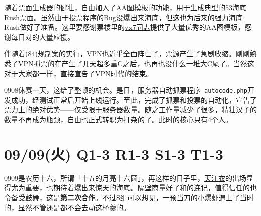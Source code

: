 随着票面生成器的健壮，\uline{自由}加入了AA图模板的功能，用于生成典型的53海底Rush票面。虽然由于投票程序的Bug没爆出来海底，但这也为后来的强力海底Rush做好了准备。这里要感谢票楼里的\uline{vx7同志}提供了大量优秀的AA图模板，感谢每日对的大量应援。

伴随着(84)规制案的实行，VPN也近乎全面阵亡了，票源产生了急剧收缩。刚刚熟悉了VPN抓票的在产生了几天超多重C之后，也再也没什么一堆大C尾了。当然这对于大家都一样，直接宣告了VPN时代的结束。

0908休赛一天，这给了整顿的机会。是日，服务器自动抓票程序~\verb=autocode.php=开发成功，经测试正常后开始上线运行。至此，完成了抓票和投票的自动化，宣告了票力上的绝对优势——仅受限于服务器数量。随之工作量减少了很多，精壮汉子的数量不再成为瓶颈，\uline{自由}也正式转职为打杂的了。此时的核心只有4个人。

\section{09/09(火) Q1-3 R1-3 S1-3 T1-3}


0909是农历十六，所谓「十五的月亮十六圆」，再这样的日子里，\uline{天江衣}的出场显得尤为重要，也期待着爆出来惊天的海底。隔壁商量好了和的连记，值得信任的也令备受鼓舞，这是\textbf{第二次合作}。不过S组可以想见，一预当刀的\uline{小爆虾}遇上了当时的，显然不管还是都不会去动这杯羹的。

